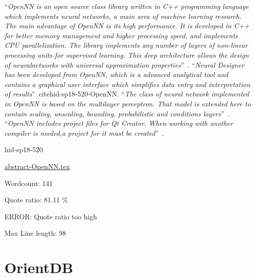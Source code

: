 \color{blue}``\emph{OpenNN is an open source class library written in C++ programming language
which implements neural networks, a main area of machine learning research.
The main advantage of OpenNN is its high performance. It is developed in 
C++ for better memory management and higher processing speed, and 
implements CPU parallelization. The library implements any number of layers
of non-linear processing units for supervised learning. This deep 
architecture allows the design of neuralnetworks with universal approximation
properties}''\color{black}~\cite{hid-sp18-520-OpenNN}.
\color{blue}``\emph{Neural Designer has been developed from OpenNN, which is a advanced analytical
tool and contains a graphical user interface which simplifies data entry
and interpretation of results}''\color{black}~cite{hid-sp18-520-OpenNN}.
\color{blue}``\emph{The class of neural network implemented in OpenNN is based on the multilayer 
perceptron. That model is extended here to contain scaling, unscaling, bounding,
probabilistic and conditions layers}''\color{black}~\cite{hid-sp18-520-OpenNNn}.
\color{blue}``\emph{OpenNN includes project files for Qt Creator. When working with another 
compiler is needed,a project for it must be created}''\color{black}~\cite{hid-sp18-520-OpenNNb}. 



\begin{IU}

hid-sp18-520

\href{https://github.com/cloudmesh-community/hid-sp18-520/blob/master//technology/abstract-OpenNN.tex}{abstract-OpenNN.tex}

 

Wordcount: 141


Quote ratio: 81.11 \%

ERROR: Quote ratio too high
 
Max Line length: 98
\end{IU}

\section{OrientDB}

